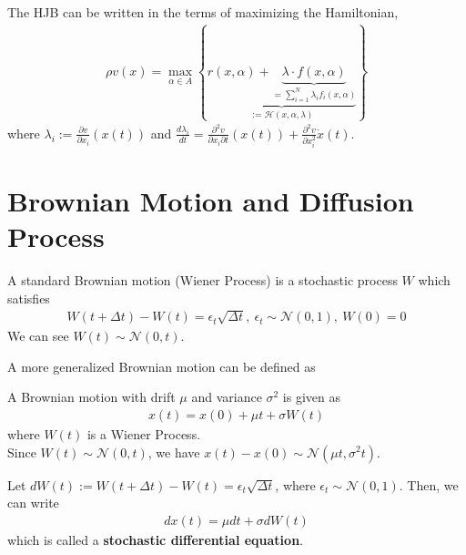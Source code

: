 \documentclass[11pt]{elegantbook}
\begin{document}
\begin{note}
    The HJB can be written in the terms of maximizing the Hamiltonian,
    \begin{equation}
        \begin{aligned}
            \rho v(x) = \max_{\alpha\in A} \left\{\underbrace{r(x,\alpha) + \underbrace{\lambda\cdot f(x,\alpha)}_{=\sum_{i=1}^N \lambda_{i} f_i(x,\alpha)}}_{:=\mathcal{H}(x,\alpha,\lambda)}\right\}
        \end{aligned}
        \nonumber
    \end{equation}
    where $\lambda_i:=\frac{\partial v}{\partial x_i}(x(t))$ and $\frac{d \lambda_i}{dt}=\frac{\partial^2 v}{\partial x_i \partial t}(x(t))+\frac{\partial^2 v}{\partial x_i^2}\dot{x}(t)$.
\end{note}

\section{Brownian Motion and Diffusion Process}
\begin{definition}
    A standard Brownian motion (Wiener Process) is a stochastic process $W$ which satisfies
    \begin{equation}
        \begin{aligned}
            W(t+\Delta t)-W(t)=\epsilon_t\sqrt{\Delta t},\ \epsilon_t\sim \mathcal{N}(0,1),\ W(0)=0
        \end{aligned}
        \nonumber
    \end{equation}
    We can see $W(t)\sim \mathcal{N}(0,t)$.
\end{definition}
A more generalized Brownian motion can be defined as
\begin{definition}
    A Brownian motion with drift $\mu$ and variance $\sigma^2$ is given as
    \begin{equation}
        \begin{aligned}
            x(t)=x(0)+ \mu t + \sigma W(t)
        \end{aligned}
        \nonumber
    \end{equation}
    where $W(t)$ is a Wiener Process.\\
    Since $W(t)\sim \mathcal{N}(0,t)$, we have $x(t)-x(0)\sim \mathcal{N}(\mu t,\sigma^2 t)$.
\end{definition}
Let $dW(t):=W(t+\Delta t)-W(t)=\epsilon_t\sqrt{\Delta t}$, where $\epsilon_t\sim \mathcal{N}(0,1)$. Then, we can write
\begin{equation}
    \begin{aligned}
        d x(t)= \mu dt + \sigma d W(t)
    \end{aligned}
    \nonumber
\end{equation}
which is called a \textbf{stochastic differential equation}.
\end{document}
